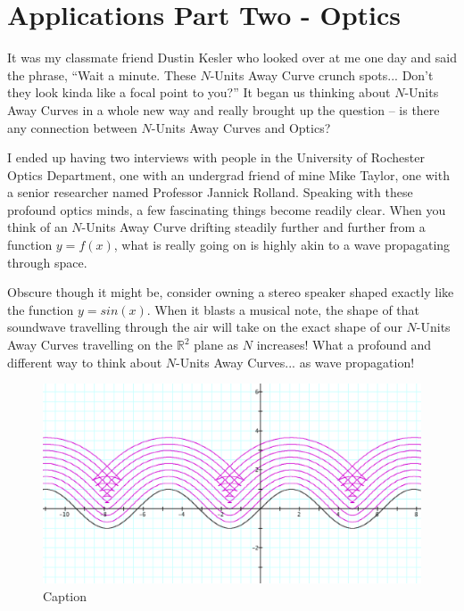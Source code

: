 \section{Applications Part Two - Optics}

It was my classmate friend Dustin Kesler who looked over at me one day and said the phrase, ``Wait a minute. These $N$-Units Away Curve crunch spots... Don’t they look kinda like a focal point to you?'' It began us thinking about $N$-Units Away Curves in a whole new way and really brought up the question – is there any connection between $N$-Units Away Curves and Optics?

I ended up having two interviews with people in the University of Rochester Optics Department, one with an undergrad friend of mine Mike Taylor, one with a senior researcher named Professor Jannick Rolland. Speaking with these profound optics minds, a few fascinating things become readily clear. When you think of an $N$-Units Away Curve drifting steadily further and further from a function $y = f(x)$, what is really going on is highly akin to a wave propagating through space.

Obscure though it might be, consider owning a stereo speaker shaped exactly like the function $y = sin(x)$. When it blasts a musical note, the shape of that soundwave travelling through the air will take on the exact shape of our $N$-Units Away Curves travelling on the $\mathbb{R}^2$ plane as $N$ increases! What a profound and different way to think about $N$-Units Away Curves... as wave propagation!

\renewcommand\fw{0.9\linewidth}

\begin{figure}[h]
  \centering
  \label{constructed:2}
  \includegraphics[width=\fw]{img/13-app/04.png}
  \caption{Caption}
\end{figure}

